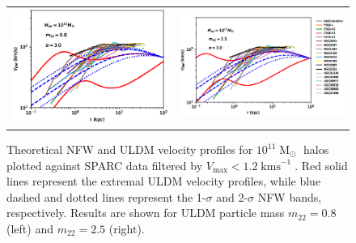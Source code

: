 \documentclass[a4paper,11pt]{article}
\begin{document}
\begin{figure}
\begin{tabular}{cc}
{\includegraphics[scale = 0.65, trim={2.5cm 2.5cm 2.1cm 0.5cm}]{pics/v_11_8_3.eps}} &
{\includegraphics[scale = 0.65, trim={2.1cm 2.5cm 0cm 0.5cm}]{pics/v_11_25_3.eps}}
\end{tabular}
\caption{Theoretical NFW and ULDM velocity profiles for $10^{11}\operatorname{M}_{\odot}$ halos plotted against SPARC data filtered by $V_{\mathrm{max}} < 1.2 \operatorname{kms}^{-1}$. Red solid lines represent the extremal ULDM velocity profiles, while  blue dashed and dotted lines represent the 1-$\sigma$ and 2-$\sigma$ NFW bands, respectively. Results are shown for ULDM particle mass $m_{22} = 0.8$ (left) and $m_{22} = 2.5 $ (right). }\label{fig:velocity_11}
\end{figure}
\end{document}
